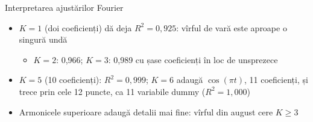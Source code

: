 \begin{frame}{Interpretarea ajustărilor Fourier}
\itemsize{\small}
\begin{itemize}
    \item $K = 1$ (doi coeficienți) dă deja $R^2 = 0{,}925$: vîrful de vară este aproape o singură undă
    \begin{itemize}
        \item $K = 2$: 0{,}966; $K = 3$: 0{,}989 cu șase coeficienți în loc de unsprezece
    \end{itemize}
    \item $K = 5$ (10 coeficienți): $R^2 = 0{,}999$; $K = 6$ adaugă $\cos(\pi t)$, 11 coeficienți, și trece prin cele 12 puncte, ca 11 variabile dummy ($R^2 = 1{,}000$)
    \item Armonicele superioare adaugă detalii mai fine: vîrful din august cere $K \ge 3$
\end{itemize}
\end{frame}

